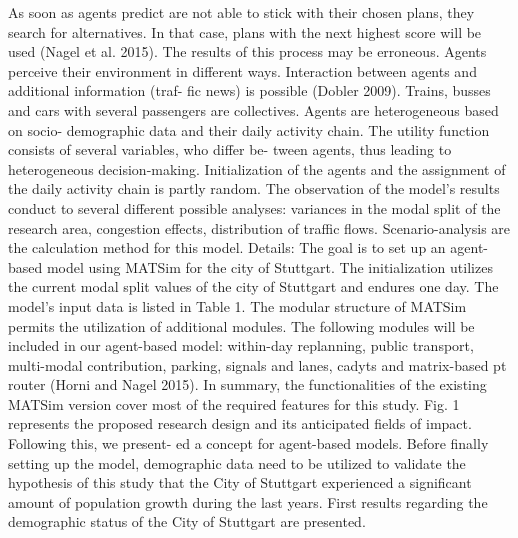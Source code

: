 As soon as agents predict are not able to stick with their chosen plans, they search for alternatives. In that case,
plans with the next highest score will be used (Nagel et al. 2015). The results of this process may be erroneous.
Agents perceive their environment in different ways. Interaction between agents and additional information (traf-
fic news) is possible (Dobler 2009).
Trains, busses and cars with several passengers are collectives. Agents are heterogeneous based on socio-
demographic data and their daily activity chain. The utility function consists of several variables, who differ be-
tween agents, thus leading to heterogeneous decision-making.
Initialization of the agents and the assignment of the daily activity chain is partly random.
The observation of the model’s results conduct to several different possible analyses: variances in the modal split
of the research area, congestion effects, distribution of traffic flows. Scenario-analysis are the calculation method for
this model.
Details:
The goal is to set up an agent-based model using MATSim for the city of Stuttgart. The initialization utilizes the
current modal split values of the city of Stuttgart and endures one day. The model’s input data is listed in Table 1.
The modular structure of MATSim permits the utilization of additional modules. The following modules will be
included in our agent-based model: within-day replanning, public transport, multi-modal contribution, parking,
signals and lanes, cadyts and matrix-based pt router (Horni and Nagel 2015).
In summary, the functionalities of the existing MATSim version cover most of the required features for this
study. Fig. 1 represents the proposed research design and its anticipated fields of impact. Following this, we present-
ed a concept for agent-based models. Before finally setting up the model, demographic data need to be utilized to
validate the hypothesis of this study that the City of Stuttgart experienced a significant amount of population growth
during the last years. First results regarding the demographic status of the City of Stuttgart are presented.


